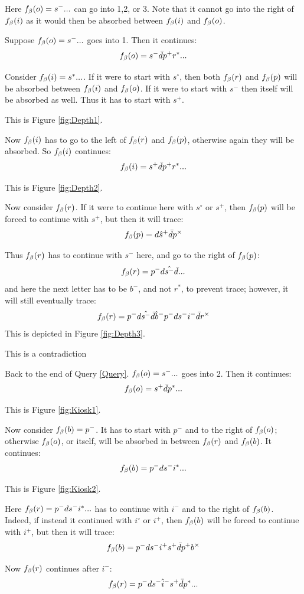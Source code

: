 Here $f_\beta(o) = s^-...$ can go into 1,2, or 3. Note that it cannot go into the right of $f_\beta(i)$ as it would then be absorbed between $f_\beta(i)$ and $f_\beta(o)$.

\label{Depth}
Suppose $f_\beta(o) = s^-...$ goes into 1. Then it continues:
\[
f_\beta(o) = s^- \bar{d} p^+ r^*...
\]

Consider $f_\beta(i) = s^*...$. If it were to start with $s^\circ$, then both $f_\beta(r)$ and $f_\beta(p)$ will be absorbed between $f_\beta(i)$ and $f_\beta(o)$. If it were to start with $s^-$ then itself will be absorbed as well. Thus it has to start with $s^+$.

This is Figure \ref{fig:Depth1}.

Now $f_\beta(i)$ has to go to the left of $f_\beta(r)$ and $f_\beta(p)$, otherwise again they will be absorbed. So $f_\beta(i)$ continues:
\[
f_\beta(i) = s^+ \bar{d} p^+ r^*...
\]

This is Figure \ref{fig:Depth2}.

Now consider $f_\beta(r)$. If it were to continue here with $s^\circ$ or $s^+$, then $f_\beta(p)$ will be forced to continue with $s^+$, but then it will trace:
\[
f_\beta(p) = d \hat{s}^+ \bar{d} p^\times
\]

Thus $f_\beta(r)$ has to continue with $s^-$ here, and go to the right of $f_\beta(p)$:
\[
f_\beta(r) = p^- d \hat{s^-} \bar{d}...
\]
and here the next letter has to be $b^-$, and not $r^*$, to prevent trace; however, it will still eventually trace:
\[
f_\beta(r) = p^- d \hat{s^-} \bar{d} \hat{b}^- p^- d s^- i^- \bar{d} r^\times
\]
This is depicted in Figure \ref{fig:Depth3}.

This is a contradiction

 \label{Kiosk}
Back to the end of Query \ref{Query}. $f_\beta(o) = s^-...$ goes into 2. Then it continues:
\[
f_\beta(o) = s^+ \bar{d} p^*...
\]

This is Figure \ref{fig:Kiosk1}.

Now consider $f_\beta(b) = p^-$. It has to start with $p^-$ and to the right of $f_\beta(o)$; otherwise $f_\beta(o)$, or itself, will be absorbed in between $f_\beta(r)$ and $f_\beta(b)$. It continues:
\[
f_\beta(b) = p^- d s^- i^*...
\]

This is Figure \ref{fig:Kiosk2}.

Here $f_\beta(r) = p^- d s^- i^*...$ has to continue with $i^-$ and to the right of $f_\beta(b)$. Indeed, if instead it continued with $i^\circ$ or $i^+$, then $f_\beta(b)$ will be forced to continue with $i^+$, but then it will trace:
\[
f_\beta(b) = p^- d s^- i^+ s^+ \bar{d} p^+ b^\times
\]

Now $f_\beta(r)$ continues after $i^-$:
\[
f_\beta(r) = p^- d s^- \hat{i}^- s^+ \bar{d} p^*...
\]

